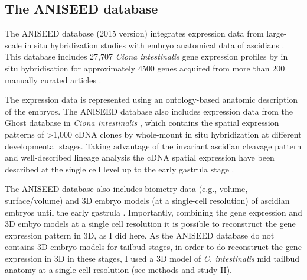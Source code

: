 \subsection{The ANISEED database}

The ANISEED database (2015 version) integrates expression data from large-scale in situ hybridization studies with embryo anatomical data of ascidians \citep{Tassy2010,Brozovic2016}. 
This database includes 27,707 \textit{Ciona intestinalis} gene expression profiles by in situ hybridisation for approximately 4500 genes acquired from more than 200 manually curated articles \citep{Brozovic2016}.

The expression data is represented using an ontology-based anatomic description of the embryos. The ANISEED database also includes expression data from the Ghost database in \textit{Ciona intestinalis} \citep{Satou2005}, which contains the spatial expression patterns of  >1,000 cDNA clones by whole-mount in situ hybridization at different developmental stages.
Taking advantage of the invariant ascidian cleavage pattern and well-described lineage analysis \citep{Conklin1905,Nishida1987} the cDNA spatial expression have been described at the single cell level up to the early gastrula stage \citep{Imai2004}.

The ANISEED database also includes biometry data (e.g., volume, surface/volume) and 3D embryo models (at a single-cell resolution) of ascidian embryos until the early gastrula \citep{Tassy2006}. Importantly, combining the gene expression and 3D embyo models at a single cell resolution it is possible to reconstruct the gene expression pattern in 3D, as I did here. 
As the ANISEED database do not contains 3D embryo models for tailbud stages, in order to do reconstruct the gene expression in 3D in these stages, I used a 3D model of \textit{C. intestinalis} mid tailbud anatomy at a single cell resolution \citep{Nakamura2012}(see methods and study II).
